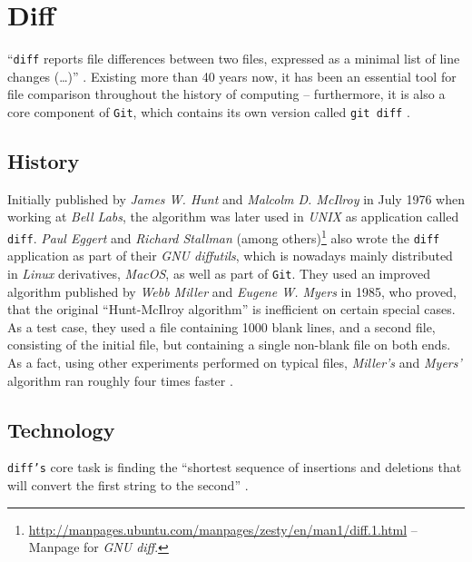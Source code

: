 \section{Diff}
\label{sec:diff}

``\texttt{diff} reports file differences between two files, expressed as a minimal list of line changes (\ldots)'' \cite[1]{Hunt1976}. Existing more than 40 years now, it has been an essential tool for file comparison throughout the history of computing -- furthermore, it is also a core component of \texttt{Git}, which contains its own version called \texttt{git diff} \cite[108]{loeliger2012version}.

\subsection{History}
\label{sec:diff-history}
Initially published by \emph{James W. Hunt} and \emph{Malcolm D. McIlroy} in July 1976 when working at \emph{Bell Labs}, the algorithm was later used in \emph{UNIX} as application called \texttt{diff}. \emph{Paul Eggert} and \emph{Richard Stallman} (among others)\footnote{\url{http://manpages.ubuntu.com/manpages/zesty/en/man1/diff.1.html} -- Manpage for \emph{GNU diff}.} also wrote the \texttt{diff} application as part of their \emph{GNU diffutils}, which is nowadays mainly distributed in \emph{Linux} derivatives, \emph{MacOS}, as well as part of \texttt{Git}. They used an improved algorithm published by \emph{Webb Miller} and \emph{Eugene W. Myers} in 1985, who proved, that the original ``Hunt-McIlroy algorithm'' is inefficient on certain special cases. As a test case, they used a file containing 1000 blank lines, and a second file, consisting of the initial file, but containing a single non-blank file on both ends. As a fact, using other experiments performed on typical files, \emph{Miller's} and \emph{Myers'} algorithm ran roughly four times faster \cite[p. 1034f]{miller1985file}.

\subsection{Technology}
\label{sec:diff-technology}
\texttt{diff's} core task is finding the ``shortest sequence of insertions and deletions that will convert the first string to the second'' \cite[1025]{miller1985file}.
